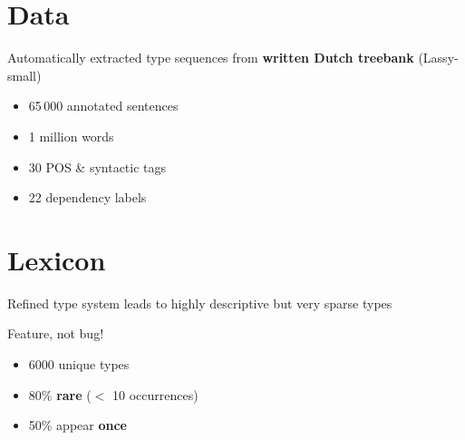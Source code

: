 \documentclass[a0paper,fleqn]{betterposter}
\begin{document}
{
\begin{minipage}[t]{0.45\textwidth}
    \section{Data}
        Automatically extracted type sequences from \textbf{written Dutch treebank} (Lassy-small)
        \begin{itemize}
            \item 65\,000 annotated sentences
            \item 1 million words
            \item 30 POS \& syntactic tags
            \item 22 dependency labels
        \end{itemize}
    \vfill 
\end{minipage}
\hfill\begin{minipage}[t]{0.45\textwidth}
    \section{Lexicon}
    Refined type system leads to highly descriptive but very sparse types
    \begin{flushright}
        {\color{methods}Feature, not bug!}
    \end{flushright}
    
    \begin{itemize}
        \item 6000 unique types
        \item 80\% \textbf{rare} ($<$ 10 occurrences)
        \item 50\% appear {\color{methods}\textbf{once}}
    \end{itemize}
    \vfill 
    
\end{minipage}
\vfill 
}
\end{document}
